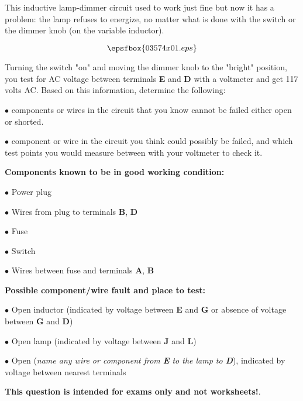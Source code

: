 

This inductive lamp-dimmer circuit used to work just fine but now it has a problem: the lamp refuses to energize, no matter what is done with the switch or the dimmer knob (on the variable inductor).

$$\epsfbox{03574x01.eps}$$

Turning the switch "on" and moving the dimmer knob to the "bright" position, you test for AC voltage between terminals {\bf E} and {\bf D} with a voltmeter and get 117 volts AC.  Based on this information, determine the following:

\vskip 10pt

\medskip
\item{$\bullet$}  components or wires in the circuit that you know cannot be failed either open or shorted.
\vskip 40pt
\item{$\bullet$}  component or wire in the circuit you think could possibly be failed, and which test points you would measure between with your voltmeter to check it.
\medskip







\goodbreak
\noindent
{\bf Components known to be in good working condition:}

\medskip
\item{$\bullet$} Power plug
\item{$\bullet$} Wires from plug to terminals {\bf B}, {\bf D}
\item{$\bullet$} Fuse
\item{$\bullet$} Switch
\item{$\bullet$} Wires between fuse and terminals {\bf A}, {\bf B}
\medskip

\vskip 10pt

\goodbreak
\noindent
{\bf Possible component/wire fault and place to test:}

\medskip
\item{$\bullet$} Open inductor (indicated by voltage between {\bf E} and {\bf G} or absence of voltage between {\bf G} and {\bf D})
\item{$\bullet$} Open lamp (indicated by voltage between {\bf J} and {\bf L})
\item{$\bullet$} Open ({\it name any wire or component from {\bf E} to the lamp to {\bf D}}), indicated by voltage between nearest terminals
\medskip







{\bf This question is intended for exams only and not worksheets!}.



